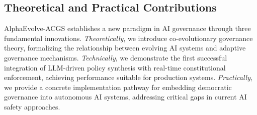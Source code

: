 \documentclass[sigconf,natbib]{acmart}
\begin{document}
\subsection{Theoretical and Practical Contributions}
AlphaEvolve-ACGS establishes a new paradigm in AI governance through three fundamental innovations. \textit{Theoretically}, we introduce co-evolutionary governance theory, formalizing the relationship between evolving AI systems and adaptive governance mechanisms. \textit{Technically}, we demonstrate the first successful integration of LLM-driven policy synthesis with real-time constitutional enforcement, achieving performance suitable for production systems. \textit{Practically}, we provide a concrete implementation pathway for embedding democratic governance into autonomous AI systems, addressing critical gaps in current AI safety approaches.
\end{document}
